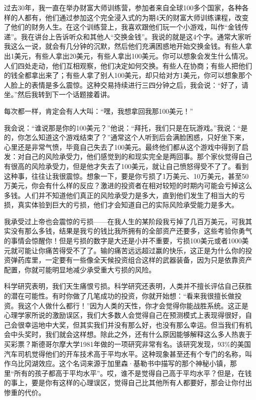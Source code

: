 过去30年，我一直在举办财富大师训练营，参加者来自全球100多个国家，各种各样的人都有，他们通过参加这个完全浸入式的为期4天的财富大师训练课程，改变了他们的财务人生。在这个训练营上，我喜欢跟他们玩一个小游戏，叫作“金钱传递”。我在讲台上告诉听众和其他人“交换金钱”。我说的就是这4个字。通常大家听我这么一说，就会有几分钟的沉默，然后他们充满困惑地开始交换金钱。有些人拿出1美元，有些人拿出20美元，有些人拿出100美元。你可以想象会发生什么情况。人们四处走动，他们互相观察，他们决定如何交换。有些人在协商；有些人把他们的钱全都拿出来了；有些人拿了别人100美元，却只给对方1美元，你可以想象那个人脸上的表情是多么震惊。这种交易持续进行三四分钟之后，我会说：“好了，请坐。”然后我转到下一个话题接着讲。

每次都一样，肯定会有人大叫：“嘿，我想拿回我那100美元！”

我会说：“谁说那是你的100美元？”他说：“拜托，我们只是在玩游戏。”我说：“是的，你怎么知道这个游戏结束了？”通常这个人听到后会满脸困惑，只好坐下来，心里还是非常气愤，毕竟自己失去了100美元。最终他们都从这个游戏中得到了启发：对自己的风险承受力，他们感觉到的和现实完全是两回事。那个家伙觉得自己有很高的风险承受力，但是他才失去了100美元，就让自己愤怒得受不了了。看到这种事，往往让我很震惊。想象一下，要是你亏损了1万美元、10万美元，甚至50万美元，你会有什么样的反应？激进的投资者在相对较短的时期内可能会亏掉这么多钱。人们并不知道他们真正的风险承受力是多大，直到他们发生了相当大的亏损，真实体验到巨大的亏损，他们才会知道自己的实际风险承受能力是多大。

我承受过上帝也会震惊的亏损——在我人生的某阶段我亏掉了几百万美元，可我其实没有那么多钱，结果是我亏的钱比我所拥有的全部资产还要多，这些考验你勇气的事情会惊醒你！但是亏损的数字是大还是小并不重要，亏损100美元或者1000美元就可能让你痛苦得受不了了。输的痛苦远远超过赢的快乐，这正是为什么你的投资弹药库里，一定要有一些像全天候投资组合这样的武器装备，因为只是依靠资产配置，你就可能明显地减少承受重大亏损的风险。

科学研究表明，我们天生痛恨亏损。科学研究还表明，人类并不擅长评估自己获胜的潜在可能性。有时你做了几笔成功的投资，你就开始想：“看来我很擅长做投资。我这个人做什么都行！”因为人类的天性，你才会觉得你能战胜系统。这正是心理学家所说的激励误区，我们大多数人会觉得自己在预测模式上表现得很好，自己会很幸运地中大奖，但其实我们并没有那么好，也没有那么幸运。但当我们有机会中头奖时，我们就会这样想。除此之外，还有什么原因能够解释这么多人热衷于买彩票？斯德哥尔摩大学1981年做的一项研究非常有名。该研究发现，93\%的美国汽车司机觉得他们的开车技术高于平均水平。这种现象甚至还有个专门的名称，叫作乌比冈湖效应。这个名词来源于加里森·基勒书中描写的那个神秘小镇，那里“所有的孩子都高于平均水平”。哎，谁不是觉得自己高于平均水平？但是，在钱的事上，要是你有这样的心理误区，觉得自己比其他所有人都要好，那会让你付出惨重的代价。

